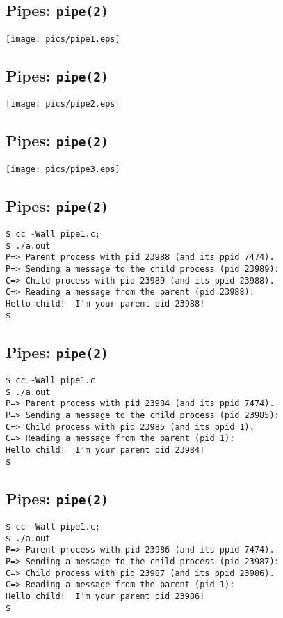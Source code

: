 \documentclass[xga]{xdvislides}
\begin{document}
\subsection{Pipes: {\tt pipe(2)}}
\begin{center}
	\texttt{[image: pics/pipe1.eps]}
\end{center}

\subsection{Pipes: {\tt pipe(2)}}
\begin{center}
	\texttt{[image: pics/pipe2.eps]}
\end{center}

\subsection{Pipes: {\tt pipe(2)}}
\begin{center}
	\texttt{[image: pics/pipe3.eps]}
\end{center}

\subsection{Pipes: {\tt pipe(2)}}
\begin{verbatim}
$ cc -Wall pipe1.c;
$ ./a.out
P=> Parent process with pid 23988 (and its ppid 7474).
P=> Sending a message to the child process (pid 23989):
C=> Child process with pid 23989 (and its ppid 23988).
C=> Reading a message from the parent (pid 23988):
Hello child!  I'm your parent pid 23988!
$
\end{verbatim}
\vfill


\subsection{Pipes: {\tt pipe(2)}}
\begin{verbatim}
$ cc -Wall pipe1.c
$ ./a.out
P=> Parent process with pid 23984 (and its ppid 7474).
P=> Sending a message to the child process (pid 23985):
C=> Child process with pid 23985 (and its ppid 1).
C=> Reading a message from the parent (pid 1):
Hello child!  I'm your parent pid 23984!
$
\end{verbatim}
\vfill

\subsection{Pipes: {\tt pipe(2)}}
\begin{verbatim}
$ cc -Wall pipe1.c;
$ ./a.out
P=> Parent process with pid 23986 (and its ppid 7474).
P=> Sending a message to the child process (pid 23987):
C=> Child process with pid 23987 (and its ppid 23986).
C=> Reading a message from the parent (pid 1):
Hello child!  I'm your parent pid 23986!
$
\end{verbatim}
\vfill
\end{document}
